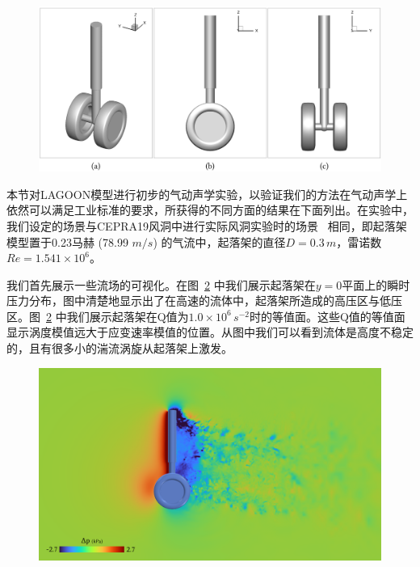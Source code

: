 \begin{figure}[!htbp]
  \centering
    \includegraphics[width=0.9\columnwidth]{figures/landing_gear_model.png}
  \label{img:landing_gear_model}
\end{figure}

本节对LAGOON模型进行初步的气动声学实验，以验证我们的方法在气动声学上依然可以满足工业标准的要求，所获得的不同方面的结果在下面列出。在实验中，我们设定的场景与CEPRA19风洞中进行实际风洞实验时的场景~\citep{doi:10.2514/6.2015-2993} 相同，即起落架模型置于0.23马赫 (78.99 $m/s$) 的气流中，起落架的直径$D=0.3 \, m$，雷诺数$Re=1.541\times 10^6$。

我们首先展示一些流场的可视化。在图~\ref{img:landing_gear_pressure} 中我们展示起落架在$y=0$平面上的瞬时压力分布，图中清楚地显示出了在高速的流体中，起落架所造成的高压区与低压区。图~\ref{img:landing_gear_pressure} 中我们展示起落架在Q值为$1.0\times 10^6 \, s^{-2}$时的等值面。这些Q值的等值面显示涡度模值远大于应变速率模值的位置。从图中我们可以看到流体是高度不稳定的，且有很多小的湍流涡旋从起落架上激发。

\begin{figure}[!htbp]
  \centering
    \includegraphics[width=0.99\columnwidth]{figures/landing_gear_pressure.png}
  \label{img:landing_gear_pressure}
\end{figure}

